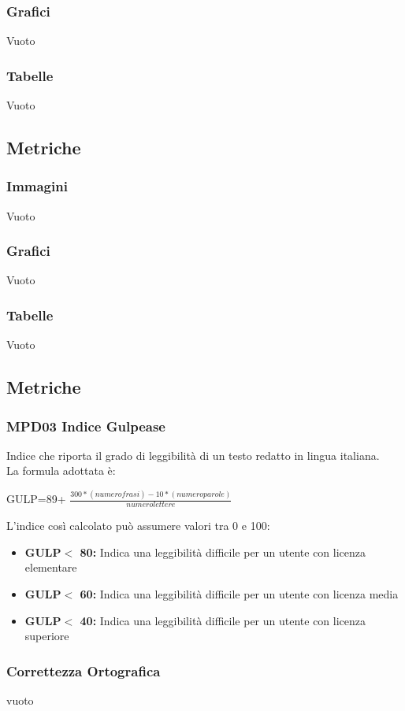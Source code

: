 \subsubsection{Grafici}
{Vuoto}
\subsubsection{Tabelle}
{Vuoto}
\subsection{Metriche}
\subsubsection{Immagini}
{Vuoto}
\subsubsection{Grafici}
{Vuoto}
\subsubsection{Tabelle}
{Vuoto}
\subsection{Metriche}
\subsubsection{MPD03 Indice Gulpease}
Indice che riporta il grado di leggibilità di un testo redatto in lingua italiana. 
\\La formula adottata è:
\begin{center}
GULP=89+ $\frac{300*(numero frasi)-10*(numero parole)}{numero lettere}$
\end{center}
L'indice così calcolato può assumere valori tra 0 e 100:
\begin{itemize}
\item \textbf{GULP$<$ 80:} Indica una leggibilità difficile per un utente con licenza elementare
	\item \textbf{GULP$<$ 60:} Indica una leggibilità difficile per un utente con licenza media
		\item \textbf{GULP$<$ 40:} Indica una leggibilità difficile per un utente con licenza superiore
\end{itemize}

\subsubsection{Correttezza Ortografica}
{vuoto}
